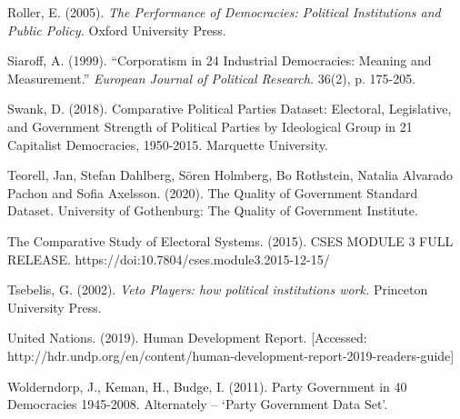 \documentclass[11pt, oneside]{article}   	%
\begin{document}
\begin{flushleft}

Roller, E. (2005). \textit{The Performance of Democracies: Political Institutions and Public Policy.} Oxford University Press.
\end{flushleft}

\begin{flushleft}

Siaroff, A. (1999). “Corporatism in 24 Industrial Democracies: Meaning and Measurement.” \textit{European Journal of Political Research.} 36(2), p. 175-205.
\end{flushleft}

\begin{flushleft}

Swank, D. (2018). Comparative Political Parties Dataset: Electoral, Legislative, and Government Strength of Political Parties by Ideological Group in 21 Capitalist Democracies, 1950-2015. Marquette University. 
\end{flushleft}

\begin{flushleft}

Teorell, Jan, Stefan Dahlberg, Sören Holmberg, Bo Rothstein, Natalia Alvarado Pachon and Sofia Axelsson. (2020). The Quality of Government Standard Dataset. University of Gothenburg: The Quality of Government Institute.
\end{flushleft}

\begin{flushleft}

The Comparative Study of Electoral Systems. (2015). CSES MODULE 3 FULL RELEASE. https://doi:10.7804/cses.module3.2015-12-15/ 
\end{flushleft}

\begin{flushleft}

Tsebelis, G. (2002). \textit{Veto Players: how political institutions work.} Princeton University Press.
\end{flushleft}

\begin{flushleft}

United Nations. (2019). Human Development Report. [Accessed: http://hdr.undp.org/en/content/human-development-report-2019-readers-guide]
\end{flushleft}

\begin{flushleft}

Wolderndorp, J., Keman, H., Budge, I. (2011). Party Government in 40 Democracies 1945-2008. Alternately – ‘Party Government Data Set’.
\end{flushleft}
\end{document}
